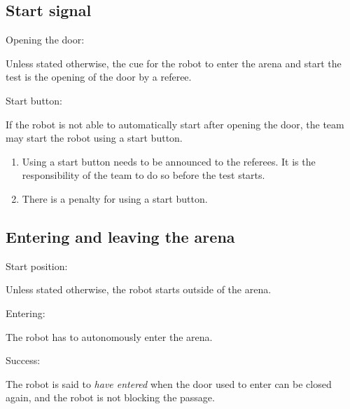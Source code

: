 \subsection{Start signal}\label{rule:start_signal}

\begin{enumerate}
  {\bf\item Opening the door:} Unless stated otherwise, the cue for the robot to enter the arena 
  and start the test is the opening of the door by a referee.
  {\bf\item Start button:} If the robot is not able to automatically start after opening the door, 
  the team may start the robot using a start button. 
  \begin{enumerate}
    \item Using a start button needs to be announced to the referees.
      It is the responsibility of the team to do so before the test starts.
    \item There is a penalty for using a start button. 
  \end{enumerate}
\end{enumerate}


\subsection{Entering and leaving the arena}\label{rule:start_position}
\begin{enumerate}
  {\bf\item Start position:} Unless stated otherwise, the robot starts outside of the arena.
  {\bf\item Entering:} The robot has to autonomously enter the arena.
  {\bf\item Success:} The robot is said to \emph{have entered} when the door used to enter 
  can be closed again, and the robot is not blocking the passage.
\end{enumerate}



